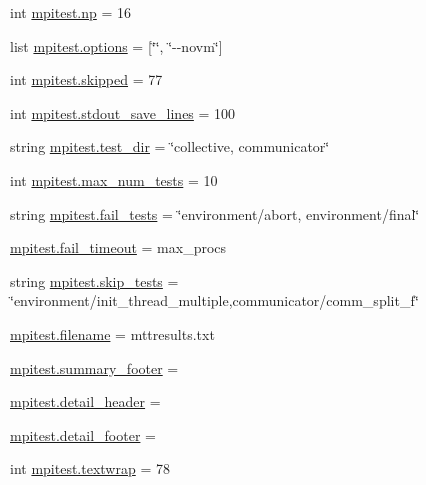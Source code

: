 \begin{DoxyCompactItemize}
\item 
int \hyperlink{namespacempitest_ae35dc1081e40dfe24adccbc698417a69}{mpitest.\-np} = 16
\item 
list \hyperlink{namespacempitest_a91cdfabf3b22da570c284023ab54044f}{mpitest.\-options} = \mbox{[}\char`\"{}\char`\"{}, \char`\"{}-\/-\/novm\char`\"{}\mbox{]}
\item 
int \hyperlink{namespacempitest_a85870f11cfd9d17b34964ec12302c3bb}{mpitest.\-skipped} = 77
\item 
int \hyperlink{namespacempitest_a4a75d79ba591224da573cc9ab62552b6}{mpitest.\-stdout\-\_\-save\-\_\-lines} = 100
\item 
string \hyperlink{namespacempitest_afb14b0cb9c4139a5d3f2bf30599704ab}{mpitest.\-test\-\_\-dir} = \char`\"{}collective, communicator\char`\"{}
\item 
int \hyperlink{namespacempitest_aa789c1fae4dda8997bf0f7d9a794f877}{mpitest.\-max\-\_\-num\-\_\-tests} = 10
\item 
string \hyperlink{namespacempitest_a6fd83076e5878f8964800690579327d8}{mpitest.\-fail\-\_\-tests} = \char`\"{}environment/abort, environment/final\char`\"{}
\item 
\hyperlink{namespacempitest_a54920d94a964e18fe3ad81cbe8363c36}{mpitest.\-fail\-\_\-timeout} = max\-\_\-procs
\item 
string \hyperlink{namespacempitest_ac08f02520db8234e89010050fa3b76ea}{mpitest.\-skip\-\_\-tests} = \char`\"{}environment/init\-\_\-thread\-\_\-multiple,communicator/comm\-\_\-split\-\_\-f\char`\"{}
\item 
\hyperlink{namespacempitest_a7b80601152b8c206cc61614fcd09929a}{mpitest.\-filename} = mttresults.\-txt
\item 
\hyperlink{namespacempitest_a982b2dded1406d02564695cb5e756197}{mpitest.\-summary\-\_\-footer} =
\item 
\hyperlink{namespacempitest_a55ff433403a926c608140ebd229f138a}{mpitest.\-detail\-\_\-header} =
\item 
\hyperlink{namespacempitest_a3f742d28fd4486162a251a03685b28d0}{mpitest.\-detail\-\_\-footer} =
\item 
int \hyperlink{namespacempitest_a4ff3a6f6296976b6e0ed6249357c3542}{mpitest.\-textwrap} = 78
\end{DoxyCompactItemize}

